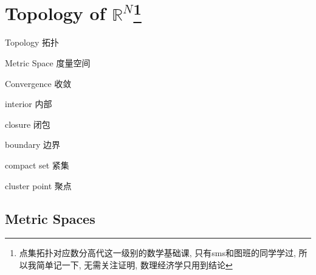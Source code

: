 \begin{comment}
    

\documentclass[lang=cn,10pt,green]{elegantbook} 
\title{2025年数理经济学笔记}
\subtitle{授课: 杨佳楠老师}

\author{徐靖}
\institute{PKU}
\date{Febuary 27, 2025}
\bioinfo{声明}{请勿用于个人学习外其他用途!}

\extrainfo{个人笔记, 如有谬误, 欢迎指正! 联系方式 : 2200012917@stu.pku.edu.cn}

\setcounter{tocdepth}{3}

\logo{logo-blue.png}
\cover{cover.jpg}

\usepackage{array}
\newcommand{\ccr}[1]{\makecell{{\color{#1}\rule{1cm}{1cm}}}}




\maketitle
\frontmatter

\tableofcontents

\mainmatter
\end{comment}
\chapter{Topology of $\mathbb{R}^N$\footnote{点集拓扑对应数分高代这一级别的数学基础课, 只有sms和图班的同学学过, 所以我简单记一下, 无需关注证明, 数理经济学只用到结论}}

\begin{introduction}[Keywords]
    \item Topology 拓扑
    \item Metric Space 度量空间
    \item Convergence 收敛
    \item interior 内部
    \item closure 闭包
    \item boundary 边界
    \item compact set 紧集
    \item cluster point 聚点
\end{introduction}

\section{Metric Spaces}
